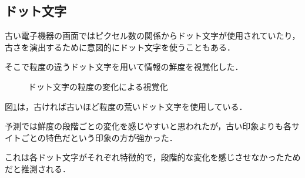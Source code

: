 \subsection{ドット文字}
\label{subsec:ver-fnt-dot}

古い電子機器の画面ではピクセル数の関係からドット文字が使用されていたり，古さを演出するために意図的にドット文字を使うこともある．

そこで粒度の違うドット文字を用いて情報の鮮度を視覚化した．

\begin{figure}[htbp]
  \begin{center}
  \end{center}
  \caption{ドット文字の粒度の変化による視覚化}
  \label{fig:ver-dot}
\end{figure}

図\ref{fig:ver-dot}は，古ければ古いほど粒度の荒いドット文字を使用している．

予測では鮮度の段階ごとの変化を感じやすいと思われたが，古い印象よりも各サイトごとの特色だという印象の方が強かった．

これは各ドット文字がそれぞれ特徴的で，段階的な変化を感じさせなかったためだと推測される．
